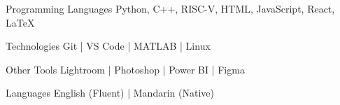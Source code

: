 
\begin{cvskills}

  \cvskill
    {Programming Languages} %
    {Python, C++, RISC-V, HTML, JavaScript, React, \LaTeX} %

  \cvskill
    {Technologies} %
    {Git | VS Code | MATLAB | Linux } %

  \cvskill
    {Other Tools} %
    {Lightroom | Photoshop | Power BI | Figma} %


  \cvskill
    {Languages} %
    {English (Fluent) | Mandarin (Native)} %

\end{cvskills}
